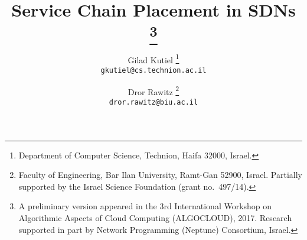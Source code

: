 \documentclass[11pt]{article}
\begin{document}
\title{\bf Service Chain Placement in SDNs%
\thanks{%
%
A preliminary version appeared in the 3rd International Workshop on
Algorithmic Aspects of Cloud Computing (ALGOCLOUD), 2017.
%
Research supported in part by Network Programming (Neptune)
Consortium, Israel.}
%
}





\author{%
Gilad Kutiel%
\thanks{Department of Computer Science, Technion, Haifa 32000, Israel.} \\
{\tt\small gkutiel@cs.technion.ac.il}
\and
Dror Rawitz%
\thanks{Faculty of Engineering, Bar Ilan University, Ramt-Gan 52900, Israel. Partially supported by the Israel Science Foundation
  (grant no.~497/14). } \\
{\tt\small dror.rawitz@biu.ac.il}
}

\end{document}
